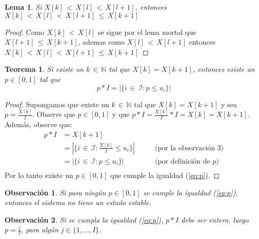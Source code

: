 \documentclass{article}
\newtheorem{teor}{Teorema}
\newtheorem{lema}{Lema}
\newtheorem{obs}{Observación}
\begin{document}
\begin{lema}\label{lema3}
Si $X[k]\,{<}\,X[l]\,{<}\,X[l{+}1]$, entonces $X[k]\,{<}\,X[l]\,{<}\,X[l{+}1]\,{\leq}\,X[k{+}1]$
\end{lema}

\begin{proof}
Como $X[k]\,{<}\,X[l]$ se sigue por el lema mortal que $X[l{+}1]\,{\leq}\,X[k{+}1]$, ademas como $X[l]\,{<}\,X[l{+}1]$ entonces $X[k]\,{<}\,X[l]\,{<}\,X[l{+}1]\,{\leq}\,X[k{+}1]$
\end{proof}

\begin{teor}
Si existe un $k\,{\in}\,\mathbb{N}$ tal que $X[k]=X[k{+}1]$, entonces existe un $p\in[0,1]$ tal que
\begin{equation}\label{eq:p}
p*I=|\{i\,{\in}\,\mathcal{I}:p\leq u_i\}|
\end{equation}
\end{teor}
\begin{proof}

Supongamos que existe un $k\,{\in}\,\mathbb{N}$ tal que $X[k]=X[k{+}1]$ y sea $p=\frac{X[k]}{I}$. Observe que $p\in[0,1]$ y que $p*I=\frac{X[k]}{I}*I=X[k]=X[k{+}1]$. Además, observe que:
\begin{align*}
p*I&=X[k{+}1]\\
&=|\{i\,{\in}\,\mathcal{I}:\frac{X[k]}{I}\leq u_i\}| &\qquad\mbox{(por la observación 3)}\\
&=|\{i\,{\in}\,\mathcal{I}:p\leq u_i\}| &\qquad\mbox{(por definición de $p$)}\\
\end{align*}
Por lo tanto existe un $p\in[0,1]$ que cumple la igualdad (\ref{eq:p}).
\end{proof}

\begin{obs}
Si para ningún $p\in[0,1]$ se cumple la igualdad (\ref{eq:p}), entonces el sistema no tiene un estado estable.
\end{obs}

\begin{obs}
Si se cumpla la igualdad (\ref{eq:p}), $p*I$ debe ser entero, luego $p=\frac{j}{I}$, para algún $j\in\{1,\ldots,I\}$.
\end{obs}
\end{document}
